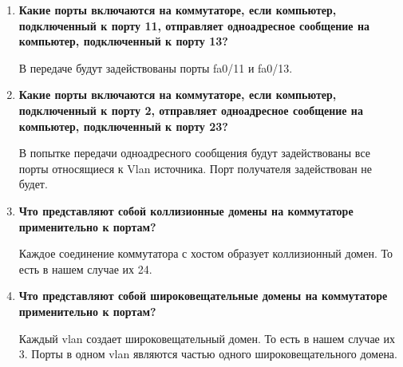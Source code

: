 \documentclass[a4paper,14pt]{extarticle}
\begin{document}
\begin{enumerate}
\begin{enumerate}
            \item \textbf{Какие порты включаются на коммутаторе, если компьютер, \linebreak подключенный к порту 11, отправляет одноадресное сообщение на компьютер, подключенный к порту 13?}\par
            В передаче будут задействованы порты fa0/11 и fa0/13.

            \item \textbf{Какие порты включаются на коммутаторе, если компьютер, \linebreak подключенный к порту 2, отправляет одноадресное сообщение на \linebreak компьютер, подключенный к порту 23?}\par
            В попытке передачи одноадресного сообщения будут задействованы все порты относящиеся к Vlan источника. Порт получателя задействован не будет.

            \item \textbf{Что представляют собой коллизионные домены на коммутаторе применительно к портам?}\par
            Каждое соединение коммутатора с хостом образует коллизионный домен. То есть в нашем случае их 24.

            \item \textbf{Что представляют собой широковещательные домены на коммутаторе применительно к портам?}\par
            Каждый vlan создает широковещательный домен. То есть в нашем случае их 3. Порты в одном vlan являются частью одного широковещательного домена.


\end{enumerate}
\end{enumerate}
\end{document}
